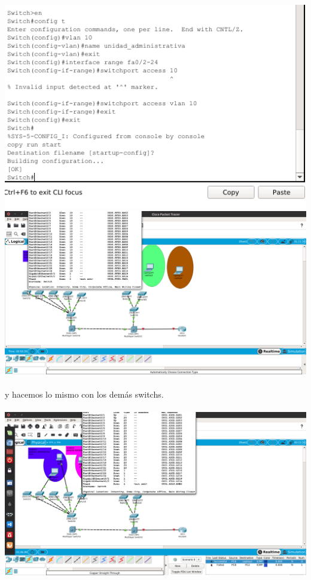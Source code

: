 \includegraphics[scale=0.85]{img/switchvlan.png}
\\
\includegraphics[scale=0.4]{img/vlan10.png} 
 \\\\
 y hacemos lo mismo con los dem\'as switchs.
 \\\\
 \includegraphics[scale=0.4]{img/vlan20.png} 
 
